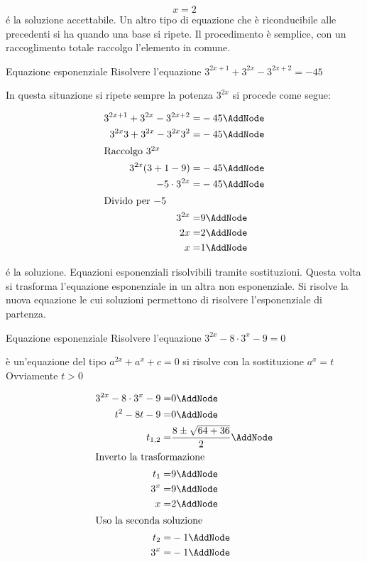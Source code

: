 	\[x=2\]
	\'{e} la soluzione accettabile.
Un altro tipo di equazione che è riconducibile alle precedenti si ha quando una base si ripete. Il procedimento è semplice, con un raccoglimento totale raccolgo l'elemento in comune. 
\begin{esempiot}{Equazione esponenziale}{}
	Risolvere l'equazione $3^{2x+1}+3^{2x}-3^{2x+2}=-45$
\end{esempiot}
	In questa situazione si ripete sempre la potenza $3^{2x}$  si procede come segue:\newpage
	\begin{NodesList}%
		\begin{align*}
			3^{2x+1}+3^{2x}-3^{2x+2}=&-45\AddNode\\
			3^{2x}3+3^{2x}-3^{2x}3^2=&-45\AddNode\\
			\intertext{\hfil Raccolgo $3^{2x}$}
			3^{2x}(3+1-9)=&-45\AddNode\\
			-5\cdot 3^{2x}=&-45\AddNode\\
			\intertext{\hfil Divido per $-5$}
			3^{2x}=&9\AddNode\\
			2x=&2\AddNode\\
			x=&1\AddNode\\
		\end{align*}
	\end{NodesList}
	\'{e} la soluzione.
Equazioni esponenziali risolvibili tramite sostituzioni. Questa volta si trasforma l'equazione esponenziale in un altra non esponenziale. Si risolve la nuova equazione le cui soluzioni permettono di risolvere l'esponenziale di partenza.
\begin{esempiot}{Equazione esponenziale}{}
	Risolvere l'equazione $3^{2x}-8\cdot 3^x-9=0$
\end{esempiot}
	 è un'equazione del tipo $a^{2x}+a^{x}+c=0$ si risolve con la sostituzione $a^{x}=t$ Ovviamente $t>0$ 
	\begin{NodesList} %
		\begin{align*}
			3^{2x}-8\cdot 3^x-9=&0\AddNode\\
			t^2-8t-9=&0\AddNode\\
			t_{1,2}=&\dfrac{8\pm\sqrt{64+36}}{2}\AddNode\\
			\intertext{\hfil Inverto la trasformazione}
			t_{1}=&9\AddNode\\
			3^{x}=&9\AddNode\\
			x=&2\AddNode\\
			\intertext{\hfil Uso la seconda soluzione}
			t_{2}=&-1\AddNode\\
			3^x=&-1\AddNode
		\end{align*}
		\LinkNodes{}%
	\end{NodesList}

